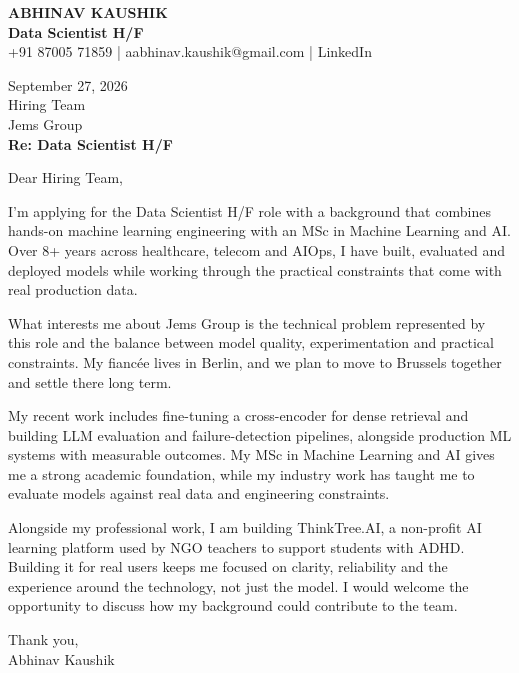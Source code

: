 \documentclass[10pt,a4paper]{article}
\begin{document}
\begin{center}
{\Large\bfseries ABHINAV KAUSHIK}\\[2pt]
{\bfseries Data Scientist H/F}\\[2pt]
+91 87005 71859 \quad | \quad aabhinav.kaushik@gmail.com \quad | \quad LinkedIn
\end{center}
\vspace{8pt}
September 27, 2026\\[6pt]
Hiring Team\\
Jems Group\\[4pt]
\textbf{Re: Data Scientist H/F}

Dear Hiring Team,

I’m applying for the Data Scientist H/F role with a background that combines hands-on machine learning engineering with an MSc in Machine Learning and AI. Over 8+ years across healthcare, telecom and AIOps, I have built, evaluated and deployed models while working through the practical constraints that come with real production data.

What interests me about Jems Group is the technical problem represented by this role and the balance between model quality, experimentation and practical constraints. My fiancée lives in Berlin, and we plan to move to Brussels together and settle there long term.

My recent work includes fine-tuning a cross-encoder for dense retrieval and building LLM evaluation and failure-detection pipelines, alongside production ML systems with measurable outcomes. My MSc in Machine Learning and AI gives me a strong academic foundation, while my industry work has taught me to evaluate models against real data and engineering constraints.

Alongside my professional work, I am building ThinkTree.AI, a non-profit AI learning platform used by NGO teachers to support students with ADHD. Building it for real users keeps me focused on clarity, reliability and the experience around the technology, not just the model. I would welcome the opportunity to discuss how my background could contribute to the team.

Thank you,\\
Abhinav Kaushik
\end{document}
